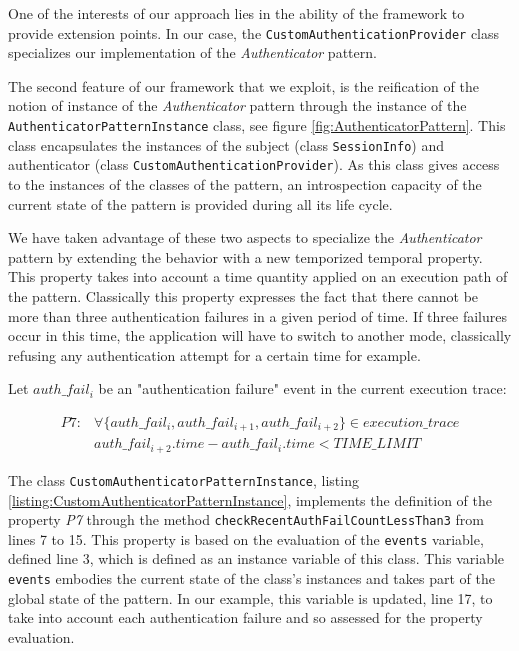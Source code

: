 One of the interests of our approach lies in the ability of the framework to provide extension points. In our case, the \texttt{CustomAuthenticationProvider} class specializes our implementation of the \textit{Authenticator} pattern.
            

 The second feature of our framework that we exploit, is the reification of the notion of instance of the \textit{Authenticator} pattern through the instance of the \texttt{AuthenticatorPatternInstance} class, see figure \ref{fig:AuthenticatorPattern}. 
This class encapsulates the instances of the subject (class \texttt{SessionInfo}) and authenticator (class \texttt{CustomAuthenticationProvider}). 
As this class gives access to the instances of the classes of the pattern, an introspection capacity of the current state of the pattern is provided during all its life cycle. 

We have taken advantage of these two aspects to specialize the \textit{Authenticator} pattern by extending the behavior with a new temporized temporal property. This property takes into account a time quantity applied on an execution path of the pattern. Classically this property expresses the fact that there cannot be more than three authentication failures in a given period of time. If three failures occur in this time, the application will have to switch to another mode, classically refusing any authentication attempt for a certain time for example.

Let $auth\_fail_i$ be an "authentication failure" event in the current execution trace:

    \begin{equation*}
       \begin{split}
           P7:& \forall \{ auth\_fail_i,auth\_fail_{i+1},auth\_fail_{i+2} \} \in execution\_trace \\
          &auth\_fail_{i+2}.time - auth\_fail_i.time < TIME\_LIMIT
      \end{split}
    \end{equation*}


The class \texttt{CustomAuthenticatorPatternInstance}, listing  \ref{listing:CustomAuthenticatorPatternInstance}, implements the definition of the property \textit{P7} through the method \texttt{checkRecentAuthFailCountLessThan3} from lines 7 to 15.
This property is based on the evaluation of the \texttt{events} variable, defined line 3, which is defined as an instance variable of this class.  This variable \texttt{events} embodies the current state of the class's instances and takes part of the global state of the pattern. 
In our example, this variable is updated, line 17, to take into account each authentication failure and so assessed for the property evaluation.    

